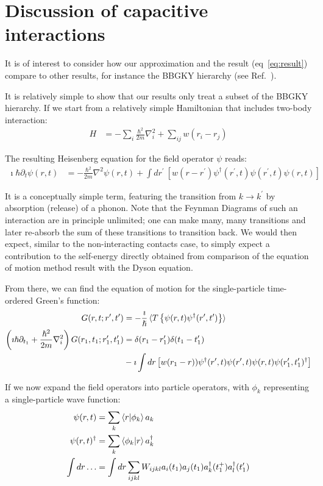 \section{Discussion of capacitive interactions}
\label{sec:discussioncapacitive}
It is of interest to consider how our approximation and the result (eq~\ref{eq:result}) compare to other results, for instance the BBGKY hierarchy (see Ref.~\cite{diventra}).

It is relatively simple to show that our results only treat a subset of the BBGKY hierarchy. If we start from a relatively simple Hamiltonian that includes two-body interaction:
\begin{align*}
H &= -\sum_i \frac{\hbar^2}{2m} \nabla_i^2 + \sum_{ij} w(r_i - r_j)
\end{align*}

The resulting Heisenberg equation for the field operator $\psi$ reads:
\begin{align*}
\imath\hbar\partial_t \psi(r, t) &= -\frac{\hbar^2}{2m} \nabla^2 \psi(r,t) + \int dr^\prime \: \left[ w(r-r^\prime) \psi^\dagger (r^\prime, t) \psi(r^\prime,t) \psi(r,t)\right]
\end{align*}

It is a conceptually simple term, featuring the transition from $k\rightarrow k^\prime$ by absorption (release) of a phonon. Note that the Feynman Diagrams of such an interaction are in principle unlimited; one can make many, many transitions and later re-absorb the sum of these transitions to transition back. We would then expect, similar to the non\hyp{}interacting contacts case, to simply expect a contribution to the self-energy directly obtained from comparison of the equation of motion method result with the Dyson equation.


From there, we can find the equation of motion for the single-particle time-ordered Green's function:
\begin{align*}
G(r,t;r^\prime,t^\prime) &= -\frac{\imath}{\hslash}\braket{T \left\{ \psi(r,t) \psi^\dagger(r^\prime,t^\prime)\right\}} \\
\left(\imath\hslash\partial_{t_1} + \frac{\hslash^2}{2m}\nabla_i^2\right) G(r_1, t_1; r_1^\prime, t_1^\prime) &= \delta(r_1 - r_1^\prime) \delta(t_1 - t_1^\prime) \\&- \imath \int dr\left[w(r_1 - r) ) \psi^\dagger (r^\prime, t) \psi(r^\prime,t) \psi(r,t) \psi(r_1^\prime, t_1^\prime)^\dagger\right]
\end{align*}

If we now expand the field operators into particle operators, with $\phi_k$ representing a single-particle wave function:
\begin{align*}
\psi(r, t) &= \sum_k \braket{r|\phi_k} a_k\\
\psi(r, t)^\dagger &= \sum_k \braket{\phi_k|r} a_k^\dagger \\
\int dr\ldots &= \int dr \sum_{ijkl} W_{ijkl} a_i(t_1) a_j (t_1) a_k^\dagger(t_1^+) a_l^\dagger(t_1^\prime)
\end{align*}


